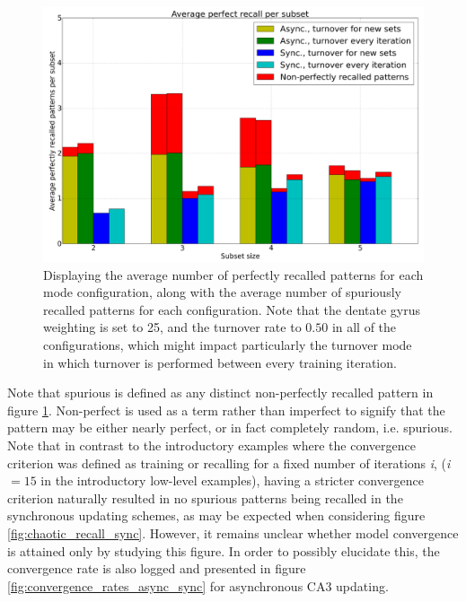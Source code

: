 
\begin{figure}
    \centering
    \includegraphics[width=12cm]{fig/average_perfect_recall_rates_by_set_size_with_spurious_bars_cut}
    \caption{Displaying the average number of perfectly recalled patterns for each mode configuration, along with the average number of spuriously recalled patterns for each configuration. Note that the dentate gyrus weighting is set to 25, and the turnover rate to $0.50$ in all of the configurations, which might impact particularly the turnover mode in which turnover is performed between every training iteration.}
    \label{fig:avg_perfect_recall_rates_with_spurious_bars}
\end{figure}

Note that spurious is defined as any distinct non-perfectly recalled pattern in figure \ref{fig:avg_perfect_recall_rates_with_spurious_bars}. Non-perfect is used as a term rather than imperfect to signify that the pattern may be either nearly perfect, or in fact completely random, i.e. spurious. Note that in contrast to the introductory examples where the convergence criterion was defined as training or recalling for a fixed number of iterations \textit{i}, (\textit{i} $=15$ in the introductory low-level examples), having a stricter convergence criterion naturally resulted in no spurious patterns being recalled in the synchronous updating schemes, as may be expected when considering figure \ref{fig:chaotic_recall_sync}. However, it remains unclear whether model convergence is attained only by studying this figure. In order to possibly elucidate this, the convergence rate is also logged and presented in figure \ref{fig:convergence_rates_async_sync} for asynchronous CA3 updating.

